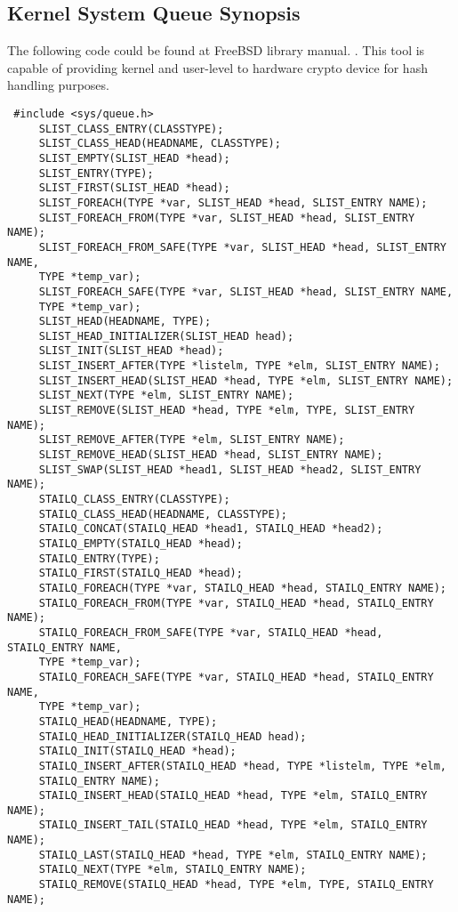 \documentclass[journal,10pt,onecolumn,compsoc,letterpaper,draftclsnofoot,table,xcdraw]{IEEEtran} \usepackage[margin=0.75in]{geometry}
\begin{document}
\subsection{Kernel System Queue Synopsis}
\noindent The following code could be found at FreeBSD library manual. \cite{11}. This tool is capable of providing kernel and user-level to hardware crypto device for  hash handling purposes. 
\begin{verbatim}
 #include <sys/queue.h>
     SLIST_CLASS_ENTRY(CLASSTYPE);
     SLIST_CLASS_HEAD(HEADNAME,	CLASSTYPE);
     SLIST_EMPTY(SLIST_HEAD *head);
     SLIST_ENTRY(TYPE);
     SLIST_FIRST(SLIST_HEAD *head);
     SLIST_FOREACH(TYPE	*var, SLIST_HEAD *head,	SLIST_ENTRY NAME);
     SLIST_FOREACH_FROM(TYPE *var, SLIST_HEAD *head, SLIST_ENTRY NAME);
     SLIST_FOREACH_FROM_SAFE(TYPE *var,	SLIST_HEAD *head, SLIST_ENTRY NAME,
	 TYPE *temp_var);
     SLIST_FOREACH_SAFE(TYPE *var, SLIST_HEAD *head, SLIST_ENTRY NAME,
	 TYPE *temp_var);
     SLIST_HEAD(HEADNAME, TYPE);
     SLIST_HEAD_INITIALIZER(SLIST_HEAD head);
     SLIST_INIT(SLIST_HEAD *head);
     SLIST_INSERT_AFTER(TYPE *listelm, TYPE *elm, SLIST_ENTRY NAME);
     SLIST_INSERT_HEAD(SLIST_HEAD *head, TYPE *elm, SLIST_ENTRY	NAME);
     SLIST_NEXT(TYPE *elm, SLIST_ENTRY NAME);
     SLIST_REMOVE(SLIST_HEAD *head, TYPE *elm, TYPE, SLIST_ENTRY NAME);
     SLIST_REMOVE_AFTER(TYPE *elm, SLIST_ENTRY NAME);
     SLIST_REMOVE_HEAD(SLIST_HEAD *head, SLIST_ENTRY NAME);
     SLIST_SWAP(SLIST_HEAD *head1, SLIST_HEAD *head2, SLIST_ENTRY NAME);
     STAILQ_CLASS_ENTRY(CLASSTYPE);
     STAILQ_CLASS_HEAD(HEADNAME, CLASSTYPE);
     STAILQ_CONCAT(STAILQ_HEAD *head1, STAILQ_HEAD *head2);
     STAILQ_EMPTY(STAILQ_HEAD *head);
     STAILQ_ENTRY(TYPE);
     STAILQ_FIRST(STAILQ_HEAD *head);
     STAILQ_FOREACH(TYPE *var, STAILQ_HEAD *head, STAILQ_ENTRY NAME);
     STAILQ_FOREACH_FROM(TYPE *var, STAILQ_HEAD	*head, STAILQ_ENTRY NAME);
     STAILQ_FOREACH_FROM_SAFE(TYPE *var, STAILQ_HEAD *head, STAILQ_ENTRY NAME,
	 TYPE *temp_var);
     STAILQ_FOREACH_SAFE(TYPE *var, STAILQ_HEAD	*head, STAILQ_ENTRY NAME,
	 TYPE *temp_var);
     STAILQ_HEAD(HEADNAME, TYPE);
     STAILQ_HEAD_INITIALIZER(STAILQ_HEAD head);
     STAILQ_INIT(STAILQ_HEAD *head);
     STAILQ_INSERT_AFTER(STAILQ_HEAD *head, TYPE *listelm, TYPE	*elm,
	 STAILQ_ENTRY NAME);
     STAILQ_INSERT_HEAD(STAILQ_HEAD *head, TYPE	*elm, STAILQ_ENTRY NAME);
     STAILQ_INSERT_TAIL(STAILQ_HEAD *head, TYPE	*elm, STAILQ_ENTRY NAME);
     STAILQ_LAST(STAILQ_HEAD *head, TYPE *elm, STAILQ_ENTRY NAME);
     STAILQ_NEXT(TYPE *elm, STAILQ_ENTRY NAME);
     STAILQ_REMOVE(STAILQ_HEAD *head, TYPE *elm, TYPE, STAILQ_ENTRY NAME);

\end{verbatim}
\end{document}
